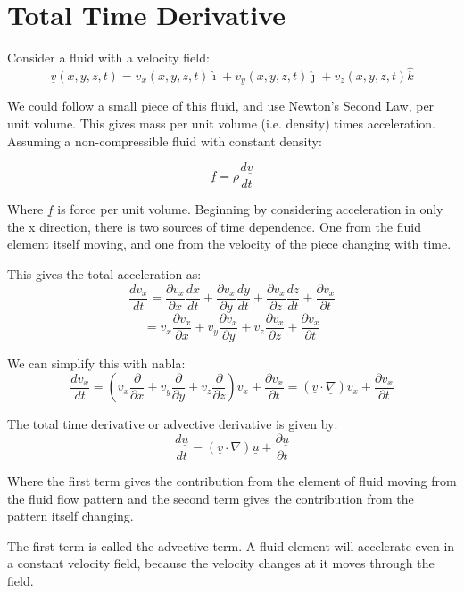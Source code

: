 
\section{Total Time Derivative}
Consider a fluid with a velocity field:
\[
    \underline{v}(x, y, z, t) = v_x(x, y, z, t) \hat{\imath} + v_y(x, y, z, t) \hat{\jmath} + v_z(x, y, z, t) \hat{k}
\]

We could follow a small piece of this fluid, and use Newton's Second Law, per unit volume. This gives mass per unit volume (i.e. density) times acceleration. Assuming a non-compressible fluid with constant density:

\[
    \underline{f} = \rho \frac{d \underline{v}}{dt}
\]

Where $\underline{f}$ is force per unit volume. Beginning by considering acceleration in only the x direction, there is two sources of time dependence. One from the fluid element itself moving, and one from the velocity of the piece changing with time.

This gives the total acceleration as:
\[
    \frac{d v_x}{dt} = \frac{\partial v_x}{\partial x} \frac{dx}{dt} + \frac{\partial v_x}{\partial y} \frac{dy}{dt} + \frac{\partial v_x}{\partial z} \frac{dz}{dt} + \frac{\partial v_x}{\partial t}
\]
\[
    = v_x \frac{\partial v_x}{\partial x} + v_y \frac{\partial v_x}{\partial y} + v_z \frac{\partial v_x}{\partial z} + \frac{\partial v_x}{\partial t}
\]

We can simplify this with nabla:
\[
    \frac{d v_x}{dt} = \left(v_x \frac{\partial}{\partial x} + v_y \frac{\partial}{\partial y} + v_z \frac{\partial}{\partial z} \right) v_x + \frac{\partial v_x}{\partial t} = \left(\underline{v} \cdot \underline{\nabla}\right) v_x + \frac{\partial v_x}{\partial t}
\]

The total time derivative or advective derivative is given by:
\[
    \frac{d \underline{u}}{dt} = \left(\underline{v} \cdot \nabla\right) \underline{u} + \frac{\partial \underline{u}}{\partial t}
\]

Where the first term gives the contribution from the element of fluid moving from the fluid flow pattern and the second term gives the contribution from the pattern itself changing.

The first term is called the advective term. A fluid element will accelerate even in a constant velocity field, because the velocity changes at it moves through the field.

